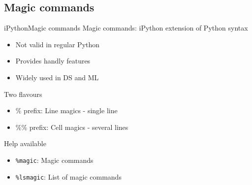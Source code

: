 \documentclass[10pt,compress]{beamer} %
\begin{document}
\subsection{Magic commands}
\begin{frame}{iPython}{Magic commands}
	Magic commands: iPython extension of Python syntax
	\begin{itemize}
	\item Not valid in regular Python
	\item Provides handly features
	\item Widely used in DS and ML
	\end{itemize}
	Two flavours
	\begin{itemize}
	\item \% prefix: Line magics - single line
	\item \%\% prefix: Cell magics - several lines
	\end{itemize}
	Help available
	\begin{itemize}
		\item \texttt{\%magic}: Magic commands
		\item \texttt{\%lsmagic}: List of magic commands
	\end{itemize}
\end{frame}
\end{document}
